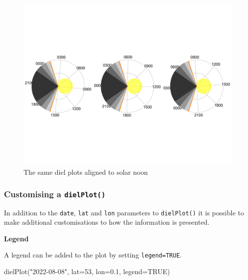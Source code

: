 \documentclass[
]{book}
\newenvironment{Shaded}{\begin{snugshade}}{\end{snugshade}}
\newcommand{\AttributeTok}[1]{\textcolor[rgb]{0.77,0.63,0.00}{#1}}
\newcommand{\ConstantTok}[1]{\textcolor[rgb]{0.00,0.00,0.00}{#1}}
\newcommand{\DecValTok}[1]{\textcolor[rgb]{0.00,0.00,0.81}{#1}}
\newcommand{\FloatTok}[1]{\textcolor[rgb]{0.00,0.00,0.81}{#1}}
\newcommand{\FunctionTok}[1]{\textcolor[rgb]{0.00,0.00,0.00}{#1}}
\newcommand{\NormalTok}[1]{#1}
\newcommand{\StringTok}[1]{\textcolor[rgb]{0.31,0.60,0.02}{#1}}
\begin{document}
\begin{figure}

{\centering \includegraphics[width=0.9\linewidth]{_main_files/figure-latex/diel-plot-sn-1} 

}

\caption{The same diel plots aligned to solar noon}\label{fig:diel-plot-sn}
\end{figure}

\hypertarget{customising-a-dielplot}{%
\subsubsection{\texorpdfstring{Customising a \texttt{dielPlot()}}{Customising a dielPlot()}}\label{customising-a-dielplot}}

In addition to the \texttt{date}, \texttt{lat} and \texttt{lon} parameters to \texttt{dielPlot()} it is possible to make additional customisations to how the information is presented.

\textbf{Legend}

A legend can be added to the plot by setting \texttt{legend=TRUE}.

\begin{Shaded}
\begin{Highlighting}[]
\FunctionTok{dielPlot}\NormalTok{(}\StringTok{"2022{-}08{-}08"}\NormalTok{, }\AttributeTok{lat=}\DecValTok{53}\NormalTok{, }\AttributeTok{lon=}\FloatTok{0.1}\NormalTok{, }\AttributeTok{legend=}\ConstantTok{TRUE}\NormalTok{)}
\end{Highlighting}
\end{Shaded}
\end{document}
